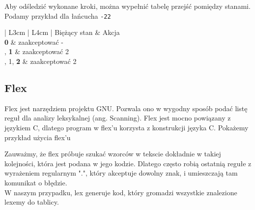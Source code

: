 		Aby odśledzić wykonane kroki, można wypełnić tabelę przejść pomiędzy stanami. Podamy przykład dla
		łańcucha \texttt{-22}

		\spacing
		\spacing

	\begin{center}
		\setlength{\tabcolsep}{0.5em}
		\renewcommand{\arraystretch}{1.2}
		\begin{tabular}{ | L{3cm} | L{4cm} | }
			\hline
			Biężący stan        & Akcja \\
			\hline
			\textbf{0}          & zaakceptować - \\
			, \textbf{1}       & zaakceptować 2 \\
			, 1, \textbf{2}    & zaakceptować 2 \\
			\hline
		\end{tabular}
	\end{center}
	
	\newpage

\subsection{Flex}

	Flex jest narzędziem projektu GNU. Pozwala ono w wygodny sposób podać listę reguł dla analizy
	leksykalnej (ang. Scanning). Flex jest mocno powiązany z językiem C, dlatego program w flex'u
	korzysta z konstrukcji języka C. Pokażemy przykład użycia flex'u
	
	\spacing
	
	\spacing
	
	Zauważmy, że flex próbuje szukać wzorców w tekscie dokładnie w takiej kolejności, która jest podana w
	jego kodzie. Dlatego często robią ostatnią regułe z wyrażeniem regularnym ".", który akceptuje
	dowolny znak, i umieszczają tam komunikat o błędzie.
	\\

	W naszym przypadku, lex generuje kod, który gromadzi wszystkie znalezione lexemy do tablicy.

	\newpage
